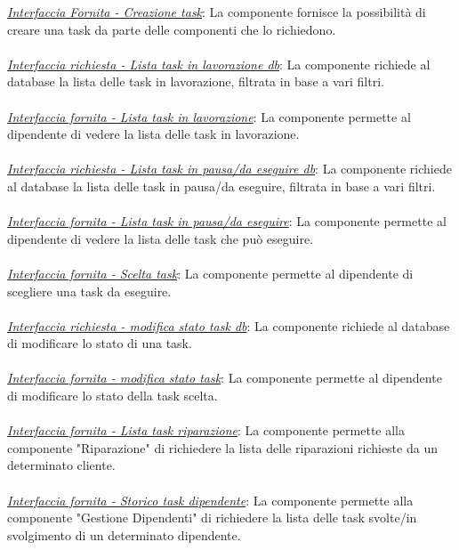 \documentclass{report}
\begin{document}
\uline{\textit{Interfaccia Fornita - Creazione task}}: 
La componente fornisce la possibilità di creare una task da parte delle componenti che lo richiedono. \\\\
\uline{\textit{Interfaccia richiesta - Lista task in lavorazione db}}: 
La componente richiede al database la lista delle task in lavorazione, filtrata in base a vari filtri.\\\\
\uline{\textit{Interfaccia fornita - Lista task in lavorazione}}: 
La componente permette al dipendente di vedere  la lista delle task in lavorazione.\\\\
\uline{\textit{Interfaccia richiesta - Lista task in pausa/da eseguire db}}: 
La componente richiede al database la lista delle task in pausa/da eseguire, filtrata in base a vari filtri.\\\\
\uline{\textit{Interfaccia fornita - Lista task in pausa/da eseguire}}: 
La componente permette al dipendente di vedere la lista delle task che può eseguire.\\\\
\uline{\textit{Interfaccia fornita - Scelta task}}: 
La componente permette al dipendente di scegliere una task da eseguire.\\\\
\uline{\textit{Interfaccia richiesta - modifica stato task db}}:
 La componente richiede al database di modificare lo stato di una task.\\\\
\uline{\textit{Interfaccia fornita - modifica stato task}}: 
La componente permette al dipendente di modificare lo stato della task scelta.\\\\
\uline{\textit{Interfaccia fornita - Lista task riparazione}}:
La componente permette alla componente "Riparazione" di richiedere la lista delle riparazioni richieste da un determinato cliente.\\\\
\uline{\textit{Interfaccia fornita - Storico task dipendente}}:
La componente permette alla componente "Gestione Dipendenti" di richiedere la lista delle task svolte/in svolgimento di un determinato dipendente.
\end{document}
